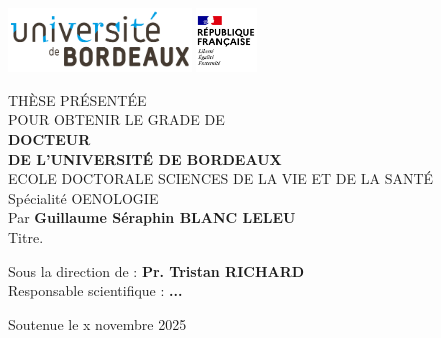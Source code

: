 \pagestyle{empty}
  \includegraphics[height=1.7cm]{0_Liminaires/Images/UBX_logo.png}\hfill
  \includegraphics[height=1.7cm]{0_Liminaires/Images/RF.png}\hfill %
  
  \vspace{0.5cm}
  
  \begin{center}
  \linespread{1.6}\selectfont %
  \begin{Large}
  THÈSE PRÉSENTÉE\\
  POUR OBTENIR LE GRADE DE \\
  {\LARGE \textbf{DOCTEUR\\DE L'UNIVERSITÉ DE BORDEAUX}}\\
  \vspace{0.55cm}
  ECOLE DOCTORALE SCIENCES DE LA VIE ET DE LA SANTÉ\\
  {\normalsize Spécialité OENOLOGIE} \\
  \vspace{0.55cm}
  Par \textbf{Guillaume Séraphin BLANC LELEU} \\
  \vspace{0.55cm}
  {\Large Titre.}
  \end{Large}
  
  \vspace{0.55cm}
  
  \linespread{1.05}\selectfont
  {\normalsize
  Sous la direction de : \textbf{Pr. Tristan RICHARD}\\
  Responsable scientifique : \textbf{...}
  }
  \end{center}
  
  \vfill
  
  \begin{center}
  {\large Soutenue le x novembre 2025 }\\    
  \end{center}
  
